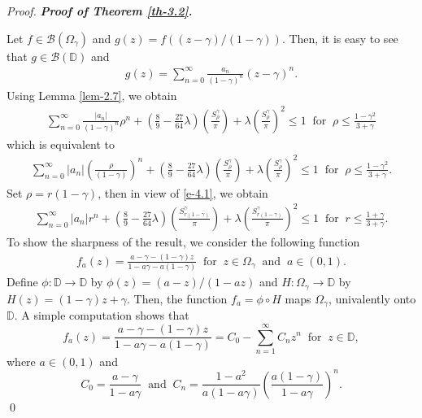 \documentclass[a4paper,12pt]{amsart}
\theoremstyle{plain}
\theoremstyle{definition}
\newenvironment{pf}[1][]{%
 \vskip 3mm
 \noindent
 \ifthenelse{\equal{#1}{}}%
  {{\slshape Proof. }}%
  {{\slshape #1.} }%
 }%
{\qed\bigskip}
\begin{document}
\begin{pf}[\bf Proof of Theorem \ref{th-3.2}]
	Let $f \in \mathcal{B}(\Omega_{\gamma})$ and $ g(z)=f((z-\gamma)/(1-\gamma)) $. Then, it is easy to see that $ g\in\mathcal{B}(\mathbb{D})$ and 
	\begin{align*}
		g(z)=\sum_{n=0}^{\infty}\frac{a_n}{(1-\gamma)^n}(z-\gamma)^n.
	\end{align*}
Using Lemma \ref{lem-2.7}, we obtain 
\begin{align*}
	\sum_{n=0}^{\infty}\frac{|a_n|}{(1-\gamma)^n}\rho^n+\left(\frac{8}{9}-\frac{27}{64}\lambda\right)\left(\frac{S^{\gamma}_{\rho}}{\pi}\right)+\lambda\left(\frac{S^{\gamma}_{\rho}}{\pi}\right)^2\leq 1\;\; \text{for}\;\; \rho\leq\frac{1-\gamma^2}{3+\gamma}
\end{align*} which is equivalent to 
\begin{align}\label{e-4.1}
	\sum_{n=0}^{\infty}{|a_n|}\left(\frac{\rho}{(1-\gamma)}\right)^n+\left(\frac{8}{9}-\frac{27}{64}\lambda\right)\left(\frac{S^{\gamma}_{\rho}}{\pi}\right)+\lambda\left(\frac{S^{\gamma}_{\rho}}{\pi}\right)^2\leq 1\;\; \text{for}\;\; \rho\leq\frac{1-\gamma^2}{3+\gamma}.
\end{align}
Set $ \rho=r(1-\gamma) $, then in view of \eqref{e-4.1}, we obtain 
\begin{align}\label{e-3.8e}
	\sum_{n=0}^{\infty}{|a_n|}r^n+\left(\frac{8}{9}-\frac{27}{64}\lambda\right)\left(\frac{S^{\gamma}_{r(1-\gamma)}}{\pi}\right)+\lambda\left(\frac{S^{\gamma}_{r(1-\gamma)}}{\pi}\right)^2\leq 1\;\; \text{for}\;\; r\leq\frac{1+\gamma}{3+\gamma}.
\end{align} 
To show the sharpness of the result, we consider the following function
\begin{align*}
	f_a(z)=\frac{a-\gamma-(1-\gamma)z}{1-a\gamma-a(1-\gamma)}\;\;\text{for}\;\; z\in \Omega_{\gamma}\;\; \text{and}\;\; a\in (0,1).
\end{align*}
Define $ \phi : \mathbb{D}\rightarrow\mathbb{D} $ by $ \phi(z)=(a-z)/(1-az) $ and $ H :\Omega_{\gamma}\rightarrow\mathbb{D} $ by $ H(z)=(1-\gamma)z+\gamma $. 
Then, the function $ f_a=\phi\circ H $ maps $ \Omega_{\gamma} $, univalently onto $ \mathbb{D}. $ A simple computation shows that
\begin{equation*}
	f_a(z)=\frac{a-\gamma-(1-\gamma)z}{1-a\gamma-a(1-\gamma)}=C_0-\sum_{n=1}^{\infty}C_nz^n\;\; \mbox{for}\;\; z\in\mathbb{D},
\end{equation*} where $ a\in (0,1) $ and 
\begin{equation*}
	C_0=\frac{a-\gamma}{1-a\gamma}\;\; \text{and}\;\; C_n=\frac{1-a^2}{a(1-a\gamma)}\left(\frac{a(1-\gamma)}{1-a\gamma}\right)^n.

\end{equation*}
\end{pf}
\end{document}
